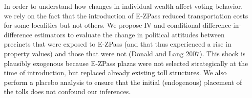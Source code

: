 In order to understand how changes in individual wealth affect voting behavior, we rely on the fact that the introduction of E-ZPass reduced transportation costs for some localities but not others. We propose IV and conditional difference-in-difference estimators to evaluate the change in political attitudes between precincts that were exposed to E-ZPass (and that thus experienced a rise in property values) and those that were not (Donald and Lang 2007). This shock is plausibly exogenous because E-ZPass plazas were not selected strategically at the time of introduction, but replaced already existing toll structures. We also perform a placebo analysis to ensure that the initial (endogenous) placement of the tolls does not confound our inferences.